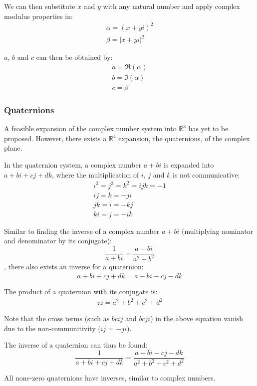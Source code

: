 \documentclass[12pt]{article}
\begin{document}
	We can then substitute $x$ and $y$ with any natural number and apply complex modulus properties in:
	\begin{gather*}
		\alpha = (x + yi)^2 \\
		\beta = \lvert x + yi \rvert^2
	\end{gather*}
	
	$a$, $b$ and $c$ can then be obtained by:
	\begin{gather*}
		a = \Re(\alpha) \\
		b = \Im(\alpha) \\
		c = \beta
	\end{gather*}
	
	\subsubsection{Quaternions}
	
	A feasible expansion of the complex number system into $\mathbb{R}^3$ has yet to be proposed. However, there exists a $\mathbb{R}^4$ expansion, the quaternions, of the complex plane.
	
	In the quaternion system, a complex number $a + bi$ is expanded into $a + bi + cj + dk$, where the multiplication of $i$, $j$ and $k$ is not communicative:
	\begin{gather*}
		i^2 = j^2 = k^2 = ijk = -1 \\
		ij = k = -ji \\
		jk = i = -kj \\
		ki = j = -ik
	\end{gather*}
	
	Similar to finding the inverse of a complex number $a + bi$ (multiplying nominator and denominator by its conjugate):
	$$\frac{1}{a + bi} = \frac{a - bi}{a^2 + b^2}$$
	, there also exists an inverse for a quaternion:
	$$\overline{a + bi + cj + dk} = a - bi - cj - dk$$
	
	The product of a quaternion with its conjugate is:
	\begin{align*}
		z\overline{z} = a^2 + b^2 + c^2 + d^2
	\end{align*}
	
	Note that the cross terms (such as $bcij$ and $bcji$) in the above equation vanish due to the non-communitivity ($ij$ = $-ji$).
	
	The inverse of a quaternion can thus be found:
	$$\frac{1}{a + bi + cj + dk} = \frac{a - bi - cj - dk}{a^2 + b^2 + c^2 + d^2}$$
	
	All none-zero quaternions have inverses, similar to complex numbers.
	
\end{document}
